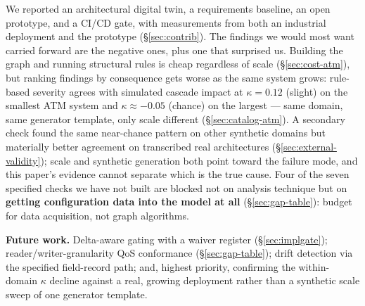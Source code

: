 \documentclass[sigconf,9pt]{acmart}
\begin{document}
We reported an architectural digital twin, a requirements baseline, an open prototype, and a
CI/CD gate, with measurements from both an industrial deployment and the prototype
(\S\ref{sec:contrib}). The findings we would most want carried forward are the negative ones, plus
one that surprised us. Building the graph and running structural rules is cheap regardless of
scale (\S\ref{sec:cost-atm}), but ranking findings by consequence gets worse as the same system
grows: rule-based severity agrees with simulated cascade impact at $\kappa = 0.12$ (slight) on the
smallest ATM system and $\kappa \approx -0.05$ (chance) on the largest --- same domain, same
generator template, only scale different (\S\ref{sec:catalog-atm}). A secondary check found the
same near-chance pattern on other synthetic domains but materially better agreement on transcribed
real architectures (\S\ref{sec:external-validity}); scale and synthetic generation both point
toward the failure mode, and this paper's evidence cannot separate which is the true cause. Four of
the seven specified checks we have not built are blocked not on analysis technique but on
\textbf{getting configuration data into the model at all} (\S\ref{sec:gap-table}): budget for data
acquisition, not graph algorithms.

\textbf{Future work.} Delta-aware gating with a waiver register (\S\ref{sec:implgate});
reader/writer-granularity QoS conformance (\S\ref{sec:gap-table}); drift detection via the
specified field-record path; and, highest priority, confirming the within-domain $\kappa$ decline
against a real, growing deployment rather than a synthetic scale sweep of one generator template.



\end{document}

